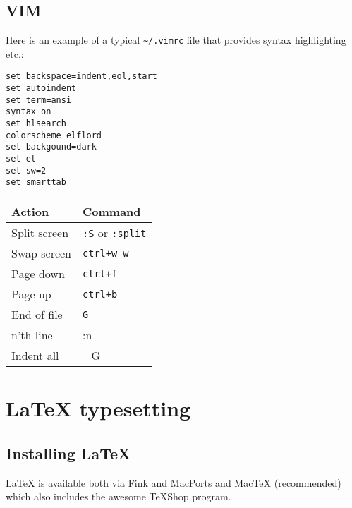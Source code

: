 \documentclass[a4paper,10pt]{article}
\begin{document}
\subsection{VIM}
Here is an example of a typical \verb"~/.vimrc" file that provides syntax highlighting etc.:
\begin{footnotesize}\begin{verbatim}
set backspace=indent,eol,start
set autoindent
set term=ansi
syntax on
set hlsearch
colorscheme elflord
set backgound=dark
set et
set sw=2
set smarttab
\end{verbatim}\end{footnotesize}
\begin{table}[h]
\begin{small}
\begin{tabular}{ll}\hline\hline
Action         & Command \\\hline
Split screen   & \verb":S" or \verb":split"\\
Swap screen    & \verb"ctrl+w w"\\
Page down      & \verb"ctrl+f"\\
Page up        & \verb"ctrl+b"\\
End of file    & \verb"G"\\
n'th line      & :n\\
Indent all     & =G\\
\hline
\end{tabular}\end{small}\end{table}

\section{\LaTeX{} typesetting}
\subsection{Installing \LaTeX{}}
\LaTeX{} is available both via Fink and MacPorts and \href{http://www.tug.org/mactex}{MacTeX} (recommended) which also includes the awesome TeXShop program.
\end{document}
